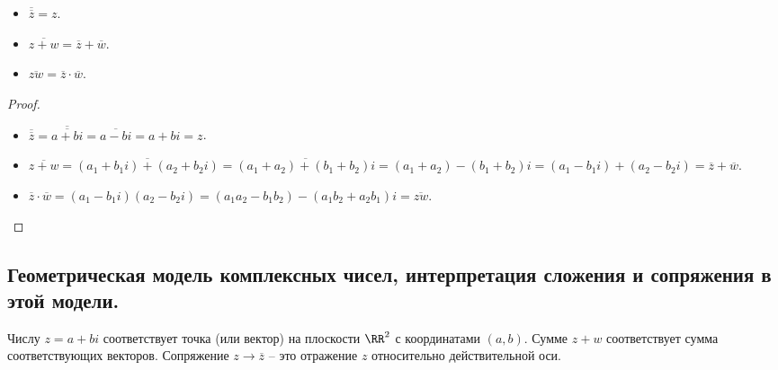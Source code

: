 \begin{itemize}[nosep]
\item $\overline{\overline{z}} = z$.
\item $\overline{z + w} = \overline{z} + \overline{w}$.
\item $\overline{zw} = \overline{z} \cdot \overline{w}$.
\end{itemize}

\begin{proof}~
    \begin{itemize}
    \item $\overline{\overline{z}} = \overline{\overline{a + bi}} = \overline{a - bi} = a + bi = z$.
    \item $\overline{z + w} = \overline{(a_1 + b_1 i) + (a_2 + b_2 i)} = \overline{(a_1 + a_2) + (b_1 + b_2) i} = (a_1 + a_2) - (b_1 + b_2)i = (a_1 - b_1 i) + (a_2 - b_2 i) = \overline{z} + \overline{w}$.
    \item $\overline{z} \cdot \overline{w} = (a_1 - b_1 i) (a_2 - b_2 i) = (a_1 a_2 - b_1 b_2) - (a_1 b_2 + a_2 b_1) i = \overline{zw}$. \qedhere
    \end{itemize}
\end{proof}

\subsection{Геометрическая модель комплексных чисел, интерпретация сложения и сопряжения в этой модели.}

Числу $z = a + bi$ соответствует точка (или вектор) на плоскости $\RR^2$ с координатами $(a, b)$.
Сумме $z + w$ соответствует сумма соответствующих векторов.
Сопряжение $z \to \overline{z}$ -- это отражение $z$ относительно действительной оси.
